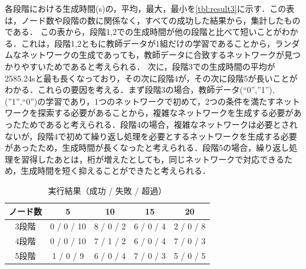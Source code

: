 \documentclass[exploratorypaper]{jsaiart} %
\begin{document}
各段階における生成時間(s)の，平均，最大，最小を\ref{tbl:result3}に示す．この表は，ノード数や段階の数に関係なく，すべての成功した結果から，集計したものである．
この表から，段階1,2での生成時間が他の段階と比べて短いことがわかる．これは，段階1,2ともに教師データが1組だけの学習であることから，ランダムなネットワークの生成であっても，教師データに合致するネットワークが見つかりやすいためであると考えられる．
次に，段階3での生成時間の平均が2585.24sと最も長くなっており，その次に段階4が，その次に段階5が長いことがわかる．これらの要因を考える．まず段階3の場合，教師データ(“0”,”1”), (”1”,“0”)の学習であり，1つのネットワークで初めて，2つの条件を満たすネットワークを探索する必要があることから，複雑なネットワークを生成する必要があったためであると考えられる．段階4の場合，複雑なネットワークは必要とされないが，段階4で初めて繰り返し処理を必要とするネットワークを生成する必要があったため，生成時間が長くなったと考えられる．段階5の場合，繰り返し処理を習得したあとは，桁が増えたとしても，同じネットワークで対応できるため，生成時間を短く抑えることができたと考えられる．


\begin{table}[htbp]
\caption{実行結果（成功 / 失敗 / 超過）}
\label{tbl:result1}
\begin{tabular}{c|cccc}
    ノード数&	5&	10&	15&	20\\
    \hline \hline
    3段階&	0 / 0 / 10&	8 / 0 / 2&	6 / 0 / 4&	2 / 0 / 8\\
    4段階&	0 / 0 / 10&	7 / 1 / 2&	6 / 0 / 4&	7 / 0 / 3\\
    5段階&	1 / 0 / 9&	6 / 0 / 4&	7 / 0 / 3&	5 / 0 / 5\\
    \hline
\end{tabular}
\end{table}
\end{document}
